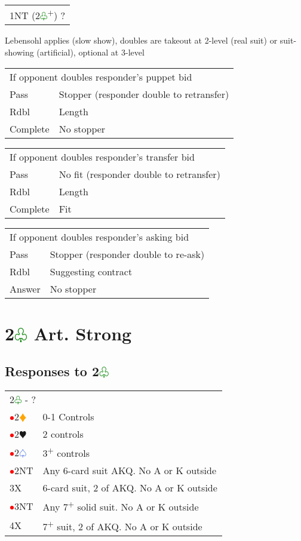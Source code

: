 \documentclass{article}
\renewcommand{\sp}{\textcolor{RoyalBlue}{$\varspade$}}
\newcommand{\he}{\textcolor{RubineRed}{$\varheart$}}
\newcommand{\di}{\textcolor{Orange}{$\vardiamond$}}
\newcommand{\cl}{\textcolor{Green}{$\varclub$}}
\newcommand{\nt}{\relsize{-1}NT\relsize{1}}
\newcommand{\up}{\textsuperscript{+}}
\newcommand{\al}{\textcolor{red}{$\bullet$}}
\begin{document}
\medskip

\begin{tabular}{|l|p{6.5cm}}
	\multicolumn{2}{l}{1\nt{} (2\cl{}\up{}) ?}\\
\end{tabular}

Lebensohl applies (slow show), doubles are takeout at 2-level (real suit) or suit-showing (artificial), optional at 3-level \\

\begin{tabular}{|l|p{6.5cm}}
	\multicolumn{2}{l}{If opponent doubles responder's puppet bid}\\
	Pass & Stopper (responder double to retransfer) \\
	Rdbl & Length \\
	Complete & No stopper
\end{tabular}

\medskip

\begin{tabular}{|l|p{6.5cm}}
	\multicolumn{2}{l}{If opponent doubles responder's transfer bid}\\
	Pass & No fit (responder double to retransfer) \\
	Rdbl & Length \\
	Complete & Fit
\end{tabular}

\medskip

\begin{tabular}{|l|p{6.5cm}}
	\multicolumn{2}{l}{If opponent doubles responder's asking bid}\\
	Pass & Stopper (responder double to re-ask) \\
	Rdbl & Suggesting contract \\
	Answer & No stopper
\end{tabular}

\section{2\cl{} Art. Strong}

\subsection{Responses to 2\cl{}}

\begin{tabular}{|l|p{6.5cm}}
	\multicolumn{2}{l}{2\cl{} - ?}\\
	\al{}2\di{} & 0-1 Controls \\
	\al{}2\he{} & 2 controls \\
	\al{}2\sp{} & 3\up{} controls \\
	\al{}2\nt{} & Any 6-card suit AKQ. No A or K outside  \\
	3X & 6-card suit, 2 of AKQ. No A or K outside \\
	\al{}3\nt{} & Any 7\up{} solid suit. No A or K outside \\
	4X & 7\up{} suit, 2 of AKQ. No A or K outside \\
\end{tabular}
\end{document}
